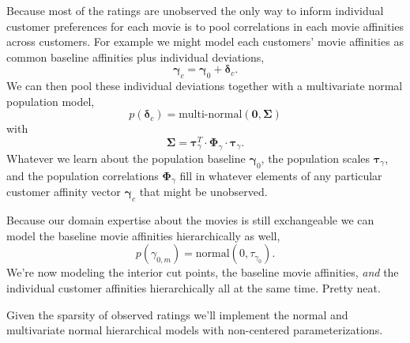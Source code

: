 \documentclass[
  letterpaper,
  DIV=11,
  numbers=noendperiod]{scrartcl}
\begin{document}
Because most of the ratings are unobserved the only way to inform
individual customer preferences for each movie is to pool correlations
in each movie affinities across customers. For example we might model
each customers' movie affinities as common baseline affinities plus
individual deviations, \[
\boldsymbol{\gamma}_{c}
=
\boldsymbol{\gamma}_{0} + \boldsymbol{\delta}_{c}.
\] We can then pool these individual deviations together with a
multivariate normal population model, \[
p(\boldsymbol{\delta}_{c})
=
\text{multi-normal}( \mathbf{0}, \boldsymbol{\Sigma} )
\] with \[
\boldsymbol{\Sigma}
=
\boldsymbol{\tau}_{\gamma}^{T} \cdot
\boldsymbol{\Phi}_{\gamma} \cdot
\boldsymbol{\tau}_{\gamma}.
\] Whatever we learn about the population baseline
\(\boldsymbol{\gamma}_{0}\), the population scales
\(\boldsymbol{\tau}_{\gamma}\), and the population correlations
\(\boldsymbol{\Phi}_{\gamma}\) fill in whatever elements of any
particular customer affinity vector \(\boldsymbol{\gamma}_{c}\) that
might be unobserved.

Because our domain expertise about the movies is still exchangeable we
can model the baseline movie affinities hierarchically as well, \[
p( \gamma_{0, m} ) = \text{normal}(0, \tau_{\gamma_{0}} ).
\] We're now modeling the interior cut points, the baseline movie
affinities, \emph{and} the individual customer affinities hierarchically
all at the same time. Pretty neat.

Given the sparsity of observed ratings we'll implement the normal and
multivariate normal hierarchical models with non-centered
parameterizations.
\end{document}
